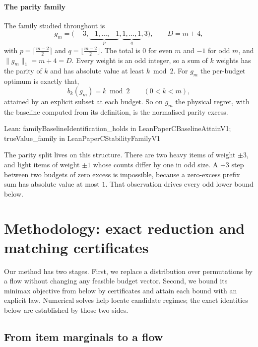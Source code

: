 \documentclass[conference]{IEEEtran}
\theoremstyle{definition}
\newcommand{\lean}[1]{\textsf{\footnotesize #1}}
\newcommand{\leanbox}[1]{%
  \par\vspace{2pt}\noindent
  {\raggedright\footnotesize\textsf{Lean: #1}\par}\vspace{2pt}}
\begin{document}
\paragraph{The parity family}
The family studied throughout is
\begin{equation}
g_{m}=\bigl(-3,\underbrace{-1,\dots,-1}_{p},\underbrace{1,\dots,1}_{q},3\bigr),
\qquad D=m+4,
\label{eq:family}
\end{equation}
with $p=\lceil\frac{m-2}{2}\rceil$ and $q=\lfloor\frac{m-2}{2}\rfloor$. The total is $0$ for
even $m$ and $-1$ for odd $m$, and $\|g_{m}\|_{1}=m+4=D$. Every weight is an odd integer, so
a sum of $k$ weights has the parity of $k$ and has absolute value at least $k\bmod2$. For
$g_{m}$ the per-budget optimum is exactly that,
\begin{equation}
b_{k}(g_{m})=k\bmod 2\qquad(0<k<m),
\label{eq:baseline}
\end{equation}
attained by an explicit subset at each budget. So on $g_{m}$ the physical regret, with the
baseline computed from its definition, is the normalised parity excess.

\leanbox{\lean{familyBaselineIdentification\_holds} in \lean{LeanPaperCBaselineAttainV1};
\lean{trueValue\_family} in \lean{LeanPaperCStabilityFamilyV1}}

The parity split lives on this structure. There are two heavy items of weight $\pm3$, and
light items of weight $\pm1$ whose counts differ by one in odd size. A $+3$ step between two
budgets of zero excess is impossible, because a zero-excess prefix sum has absolute value at
most $1$. That observation drives every odd lower bound below.

\section{Methodology: exact reduction and matching certificates}
\label{sec:flow}

Our method has two stages. First, we replace a distribution over permutations by a flow
without changing any feasible budget vector. Second, we bound its minimax objective from
below by certificates and attain each bound with an explicit law. Numerical solves help
locate candidate regimes; the exact identities below are established by those two sides.

\subsection{From item marginals to a flow}
\end{document}
